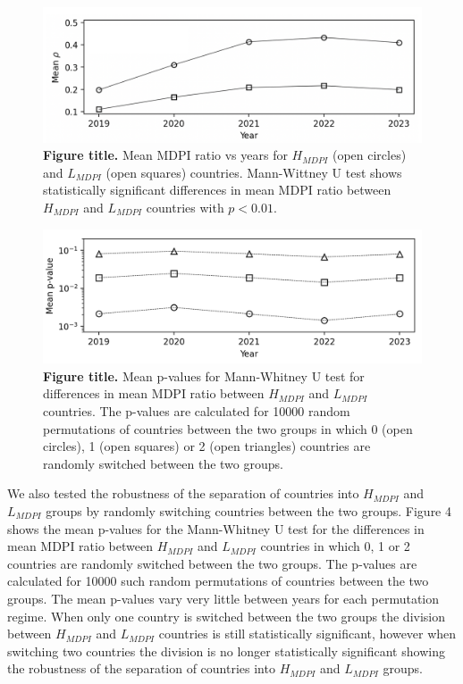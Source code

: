 \documentclass[amsfonts, amssymb, prl, superscriptaddress, notitlepage, twocolumn, nofootinbib]{revtex4-2}
\begin{document}
\begin{figure}
    \centering
    \includegraphics[width=1.0\linewidth]{Fig02f.png}
    \caption{\label{fig:fig3} {\bf Figure title.} Mean MDPI ratio vs years for $H_{MDPI}$ (open circles) and $L_{MDPI}$ (open squares) countries. Mann-Wittney U test shows statistically significant  differences in mean MDPI ratio between $H_{MDPI}$ and $L_{MDPI}$ countries with $p<0.01$.
    }
\end{figure}

\begin{figure}
    \centering
    \includegraphics[width=1.0\linewidth]{Fig02af.png}
    \caption{\label{fig:fig4} {\bf Figure title.} Mean p-values for Mann-Whitney U test for differences in mean MDPI ratio between $H_{MDPI}$ and $L_{MDPI}$ countries. The p-values are calculated for 10000 random permutations of countries between the two groups in which 0 (open circles), 1 (open squares) or 2 (open triangles) countries are randomly switched between the two groups.
    }
\end{figure}

We also tested the robustness of the separation of countries into $H_{MDPI}$ and $L_{MDPI}$ groups by randomly switching countries between the two groups.
Figure 4 shows the mean p-values for the Mann-Whitney U test for the differences in mean MDPI ratio between $H_{MDPI}$ and $L_{MDPI}$ countries in which 0, 1 or 2 countries are randomly switched between the two groups. The p-values are calculated for 10000 such random permutations of countries between the two groups. The mean p-values vary very little between years for each permutation regime. When only one country is switched between the two groups the division between $H_{MDPI}$ and $L_{MDPI}$ countries is still statistically significant, however when switching two countries the division is no longer statistically significant showing the robustness of the separation of countries into $H_{MDPI}$ and $L_{MDPI}$ groups. 
\end{document}
